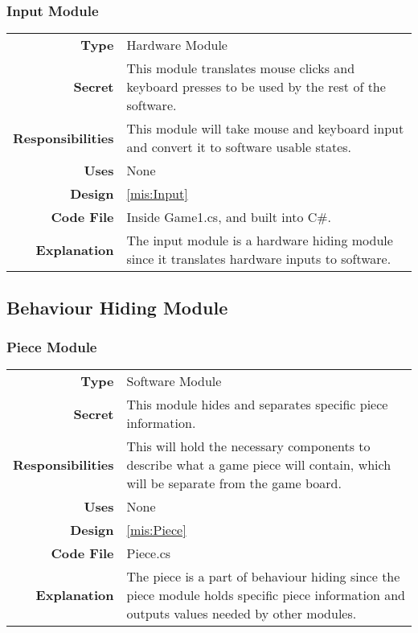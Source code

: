 \documentclass[10pt]{article}
\makeatletter
\newcommand{\CustomLabel}[1]{\Hy@raisedlink{\hypertarget{#1}{}}\label{#1}}
\makeatother
\begin{document}
    \subsubsection{Input Module}\CustomLabel{mod:Input}
    \begin{tabularx}{\linewidth}{ >{\bfseries}r X }
        Type            & Hardware Module \\
        Secret          & This module translates mouse clicks and keyboard presses to be used by the rest of the software. \\
        Responsibilities & This module will take mouse and keyboard input and convert it to software usable states. \\
        Uses            & None \\
        Design          & \ref{mis:Input} \\
        Code File       & Inside Game1.cs, and built into C\#. \\
        Explanation     & The input module is a hardware hiding module since it translates hardware inputs to software. \\
    \end{tabularx}

\subsection{Behaviour Hiding Module}

    \subsubsection{Piece Module}\CustomLabel{mod:Piece}
        \begin{tabularx}{\linewidth}{ >{\bfseries}r X }
            Type            & Software Module \\
            Secret          & This module hides and separates specific piece information. \\
            Responsibilities & This will hold the necessary components to describe what a game piece will contain, which will be separate from the game board. \\
            Uses            & None \\
            Design          & \ref{mis:Piece} \\
            Code File       & Piece.cs \\
            Explanation     & The piece is a part of behaviour hiding since the piece module holds specific piece information and outputs values needed by other modules. \\
        \end{tabularx}
\end{document}
